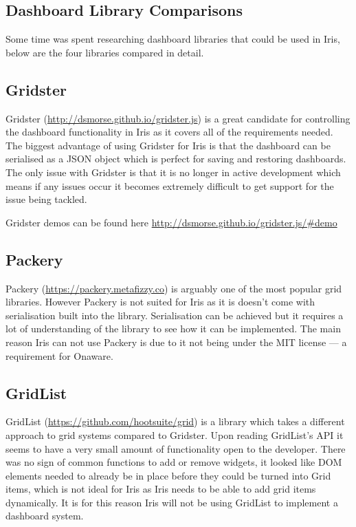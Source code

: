 \documentclass[12pt,a4paper,titlepage]{report}
\begin{document}
\begin{appendices}
\chapter{Dashboard Library Comparisons}\label{sec:dashboards}

Some time was spent researching dashboard libraries that could be used in Iris, below are the four libraries compared in detail.

\section{Gridster}

Gridster (\url{http://dsmorse.github.io/gridster.js}) is a great candidate for controlling the dashboard functionality in Iris as it covers all of the requirements needed. The biggest advantage of using Gridster for Iris is that the dashboard can be serialised as a JSON object which is perfect for saving and restoring dashboards. The only issue with Gridster is that it is no longer in active development which means if any issues occur it becomes extremely difficult to get support for the issue being tackled.

Gridster demos can be found here \url{http://dsmorse.github.io/gridster.js/#demo}

\section{Packery}

Packery (\url{https://packery.metafizzy.co}) is arguably one of the most popular grid libraries. However Packery is not suited for Iris as it is doesn't come with serialisation built into the library. Serialisation can be achieved but it requires a lot of understanding of the library to see how it can be implemented. The main reason Iris can not use Packery is due to it not being under the MIT license --- a requirement for Onaware.

\section{GridList}

GridList (\url{https://github.com/hootsuite/grid}) is a library which takes a different approach to grid systems compared to Gridster. Upon reading GridList's API it seems to have a very small amount of functionality open to the developer. There was no sign of common functions to add or remove widgets, it looked like DOM elements needed to already be in place before they could be turned into Grid items, which is not ideal for Iris as Iris needs to be able to add grid items dynamically. It is for this reason Iris will not be using GridList to implement a dashboard system.


\end{appendices}
\end{document}
